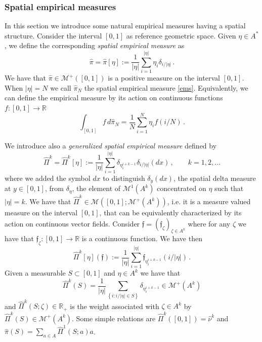 \documentclass[reqno]{amsart}
\theoremstyle{plain}
\theoremstyle{definition}
\theoremstyle{remark}
\numberwithin{equation}{section}
\numberwithin{theorem}{section}
\renewcommand{\hat}{\widehat}
\newcommand{\<}{\langle}
\renewcommand{\>}{\rangle}
\begin{document}
	
	
	
	\subsubsection{Spatial empirical measures}
	In this section we introduce some natural empirical measures having a spatial structure. Consider the interval $[0,1]$ as reference geometric space. Given $\eta\in A^*$, we define the corresponding {\it spatial empirical measure} as
	\begin{equation}\label{ems}
		\hat\pi=\hat\pi[\eta]:=\frac{1}{|\eta|}\sum_{i=1}^{|\eta|}\eta_i\delta_{i/|\eta|}\,.
	\end{equation}
	We have that $\hat\pi\in \mathcal M^+([0,1])$ is a positive measure on the interval $[0,1]$. When $|\eta|=N$
	we call $\hat\pi_N$ the spatial empirical measure \eqref{ems}. Equivalently, we can define the empirical measure by its action on continuous functions $f:[0,1]\to \mathbb R$
	\begin{equation}
		\int_{[0,1]}f\,d \hat\pi_N=\frac 1N\sum_{i=1}^N\eta_if(i/N)\,.
	\end{equation}
	
	We introduce also a {\it generalized spatial empirical measure} defined by
	\begin{equation}\label{gesm}
		\hat \Pi^k=\hat\Pi^k[\eta]:=\frac{1}{|\eta|}\sum_{i=1}^{|\eta|}\delta_{\eta_i^{i+k-1}}\delta_{i/|\eta|}(dx)\,,\qquad k=1,2,\dots
	\end{equation}
	where we added the symbol $dx$ to distinguish $\delta_y(dx)$, the spatial delta measure at $y\in[0,1]$, from $\delta_{\eta}$, the element of $\mathcal M^1(A^k)$ concentrated on $\eta$ such that $|\eta|=k$. We have that $\hat\Pi^k\in \mathcal M([0,1]; \mathcal M^+(A^k))$, i.e. it is a measure valued measure on the interval $[0,1]$, that can be equivalently characterized by its action on continuous vector fields. Consider $\mathfrak f=(\mathfrak f_\zeta)_{\zeta\in A^k}$ where for any $\zeta$ we have that $\mathfrak f_\zeta:[0,1]\to \mathbb R$ is a continuous function. We have then
	$$
	\hat\Pi^k[\eta](\mathfrak f):=\frac{1}{|\eta|}\sum_{i=1}^{|\eta|}\mathfrak f_{\eta_i^{i+k-1}}(i/|\eta|)\,.
	$$
	Given a measurable $S\subset [0,1]$ and $\eta\in A^k$ we have that 
	$$\hat\Pi^k(S)=\frac{1}{|\eta|}\sum_{\left\{i:i/|\eta|\in S\right\}}\delta_{\eta_i^{i+k-1}}\in \mathcal M^+(A^k)$$ and $\hat \Pi^k(S;\zeta)\in \mathbb R_+$ is the weight associated with $\zeta\in A^k$ by $\hat\Pi^k(S)\in \mathcal M^+(A^k)$. Some simple relations are $\hat \Pi^k([0,1])=\hat\nu^k$ and $\hat\pi(S)=\sum_{a\in A} \hat\Pi^1(S;a)a$.
	
\end{document}
